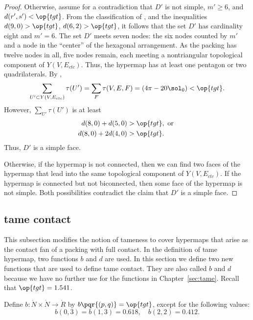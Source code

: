 \begin{proof}
  Otherwise, assume for a contradiction
that $D'$ is not simple, $m'\ge 6$, and $d(r',s')<\op{tgt}$.  From the
classification of \cite[p.~126,~Fig.~12.1]{Hales:2006:DCG}, and the
inequalities $d(9,0) > \op{tgt}$, $d(6,2) > \op{tgt}$, it follows that
the set $D'$ has cardinality eight and $m'=6$.  The set $D'$ meets seven
nodes: the six nodes counted by $m'$ and a node in the ``center'' of
the hexagonal arrangement.  As the packing has twelve nodes in all,
 five  nodes remain, each  meeting a
nontriangular topological component of $Y(V,E_{ctc})$.  Thus, the hypermap has
 at least one pentagon or two quadrilaterals.  By ,
\[
  \sum_{U'\subset Y(V,E_{ctc})} \tau(U') 
=\sum_F \tau(V,E,F) = (4\pi - 20\sol_0) < \op{tgt}.
\]
However, $\sum_{U'} \tau(U')$ is at least
\begin{align*}
d(8,0) + d(5,0) &> \op{tgt}, \text{ or }\\
d(8,0) + 2 d(4,0) &> \op{tgt}.
\end{align*}
Thus, $D'$ is a simple face.
%
%

  Otherwise, if the hypermap is
not connected, then we can find two faces of the hypermap that lead
into the same topological component of $Y(V,E_{ctc})$.  If the
hypermap is connected but not biconnected, then some face of the
hypermap is not simple.  Both possibilities contradict the claim that
$D'$ is a simple face.
\end{proof}



\subsection{tame contact}

This subsection modifies the notion of tameness to cover hypermaps
that arise as the contact fan of a packing with full contact.  In the
definition of tame hypermap, two functions $b$ and $d$ are used.  In
this section we define two new functions that are used to define tame
contact.  They are also  called $b$ and $d$ because we have no
further use for the functions in Chapter~\ref{sec:tame}.  
Recall that $\op{tgt}=1.541$.
%
%

\begin{definition}[b]
  Define $b:\ring{N}\times \ring{N}\to \ring{R}$ by
  $b\pqr{(p,q)}=\op{tgt}$, except for the following values:
\[
b(0,3)=b(1,3)=0.618,\quad b(2,2)=0.412.
\]
\end{definition}
%

